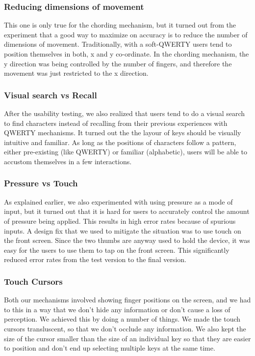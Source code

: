 \subsubsection{Reducing dimensions of movement}

This one is only true for the chording mechanism, but it turned out
from the experiment that a good way to maximize on accuracy is to
reduce the number of dimensions of movement. Traditionally, with a
soft-QWERTY users tend to position themselves in both, x and y
co-ordinate. In the chording mechanism, the y direction was being
controlled by the number of fingers, and therefore the movement was
just restricted to the x direction.

\subsubsection{Visual search vs Recall}

After the usability testing, we also realized that users tend to do a
visual search to find characters instead of recalling from their
previous experiences with QWERTY mechanisms. It turned out the the
layour of keys should be visually intuitive and familiar. As long as
the positions of characters follow a pattern, either pre-existing
(like QWERTY) or familiar (alphabetic), users will be able to accustom
themselves in a few interactions.

\subsubsection{Pressure vs Touch}

As explained earlier, we also experimented with using pressure as a
mode of input, but it turned out that it is hard for users to
accurately control the amount of pressure being applied. This results
in high error rates because of spurious inputs. A design fix that we
used to mitigate the situation was to use touch on the front
screen. Since the two thumbs are anyway used to hold the device, it
was easy for the users to use them to tap on the front screen. This
significantly reduced error rates from the test version to the final
version.

\subsubsection{Touch Cursors}

Both our mechanisms involved showing finger positions on the screen,
and we had to this in a way that we don't hide any information or
don't cause a loss of perception. We achieved this by doing a number
of things. We made the touch cursors transluscent, so that we don't
occlude any information. We also kept the size of the cursor smaller
than the size of an individual key so that they are easier to position
and don't end up selecting multiple keys at the same time.
